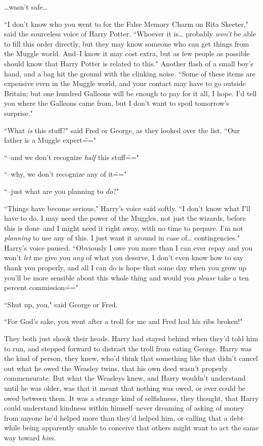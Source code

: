 {\ldots}wasn't safe{\ldots}

``I don't know who you went to for the False Memory Charm on Rita Skeeter," said the sourceless voice of Harry Potter. ``Whoever it is{\ldots} probably \emph{won't} be able to fill this order directly, but they may know someone who can get things from the Muggle world. And\---I know it may cost extra, but as few people as possible should know that Harry Potter is related to this." Another flash of a small boy's hand, and a bag hit the ground with the clinking noise. ``Some of these items are expensive even in the Muggle world, and your contact may have to go outside Britain; but one hundred Galleons will be enough to pay for it all, I hope. I'd tell you where the Galleons came from, but I don't want to spoil tomorrow's surprise."

``What \emph{is} this stuff?" said Fred or George, as they looked over the list. ``Our father is a Muggle expert\==="

``\---and we don't recognize \emph{half} this stuff\==="

``\---why, we don't recognize any of it\==="

``\---just what are you planning to \emph{do}?"

``Things have become serious," Harry's voice said softly. ``I don't know what I'll have to do. I may need the power of the Muggles, not just the wizards, before this is done\---and I might need it right away, with no time to prepare. I'm not \emph{planning} to use any of this. I just want it around in case of{\ldots} contingencies." Harry's voice paused. ``Obviously I owe you more than I can ever repay and you won't \emph{let} me give you \emph{any} of what you deserve, I don't even know how to say thank you properly, and all I can do is hope that some day when you grow up you'll be more sensible about this whole thing and would you \emph{please} take a ten percent commission\==="

``Shut up, you," said George or Fred.

``For God's sake, you went after a troll for me and Fred had his ribs broken!"

They both just shook their heads. Harry had stayed behind when they'd told him to run, and stepped forward to distract the troll from eating George. Harry was the kind of person, they knew, who'd think that something like that didn't cancel out what he owed the Weasley twins, that his own deed wasn't properly commensurate. But what the Weasleys knew, and Harry wouldn't understand until he was older, was that it meant that nothing was owed, or ever could be owed between them. It was a strange kind of selfishness, they thought, that Harry could understand kindness within himself\---never dreaming of asking of money from anyone he'd helped more than they'd helped him, or calling that a debt\---while being apparently unable to conceive that others might want to act the same way toward \emph{him}.

